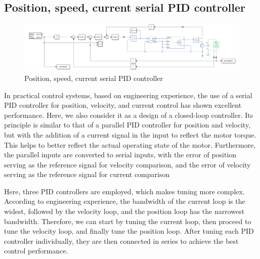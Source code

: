 \documentclass[11pt,a4paper]{article}%
\begin{document}
\subsection{Position, speed, current serial PID controller}
\begin{figure}[H]
    \centering
    \includegraphics[width=1\textwidth]{controller3}
    \caption{Position, speed, current serial PID controller}
    \label{controller3}
\end{figure}

In practical control systems, based on engineering experience, the use of a serial PID controller for position, velocity, and current control has shown excellent performance. Here, we also consider it as a design of a closed-loop controller. Its principle is similar to that of a parallel PID controller for position and velocity, but with the addition of a current signal in the input to reflect the motor torque. This helps to better reflect the actual operating state of the motor. Furthermore, the parallel inputs are converted to serial inputs, with the error of position serving as the reference signal for velocity comparison, and the error of velocity serving as the reference signal for current comparison

Here, three PID controllers are employed, which makes tuning more complex. According to engineering experience, the bandwidth of the current loop is the widest, followed by the velocity loop, and the position loop has the narrowest bandwidth. Therefore, we can start by tuning the current loop, then proceed to tune the velocity loop, and finally tune the position loop. After tuning each PID controller individually, they are then connected in series to achieve the best control performance.

\newpage
\end{document}
